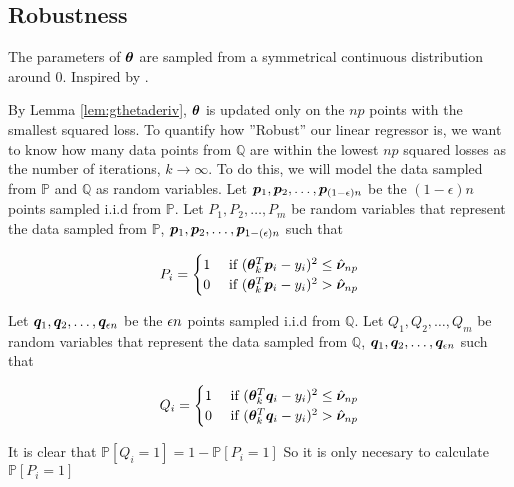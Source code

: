 \documentclass{article} %
\begin{document}
	\subsection{Robustness}
	\begin{assumption}\label{asm:sym-0}
		The parameters of ${\bm{\theta}}$ are sampled from a symmetrical continuous distribution around 0. Inspired by \cite{Lu_2020}. 
	\end{assumption}
	By Lemma \ref{lem:gthetaderiv}, ${\bm{\theta}}$ is updated only on the $np$ points with the smallest squared loss. To quantify how ''Robust'' our linear regressor is, we want to know how many data points from $\mathbb{Q}$ are within the lowest $np$ squared losses as the number of iterations, $k \to \infty$. To do this, we will model the data sampled from $\mathbb{P}$ and $\mathbb{Q}$ as random variables. Let ${\bm{p}}_1,{\bm{p}}_2,\ldots,{\bm{p}}_{(1-{\epsilon})n}$ be the $(1-\epsilon)n$ points sampled i.i.d from $\mathbb{P}$. Let $P_1,P_2,\dots,P_m$ be random variables that represent the data sampled from $\mathbb{P}$,  ${\bm{p}}_1,{\bm{p}}_2,\dots,{\bm{p}}_{1-({\epsilon})n}$ such that
	
	\begin{equation}
		P_i = \begin{cases}
					1 & \text{ if } ({\bm{\theta}}_k^T{\bm{p}}_i - y_{i})^2 \leq \hat{{\bm{\nu}}}_{np} \\
					0 & \text{ if } ({\bm{\theta}}_k^T{\bm{p}}_i - y_{i})^2 > \hat{{\bm{\nu}}}_{np} \\
				\end{cases}
	\end{equation}
	
	Let ${\bm{q}}_1,{\bm{q}}_2,\ldots,{\bm{q}}_{{\epsilon} n}$ be the ${\epsilon} n$ points sampled i.i.d from $\mathbb{Q}$. Let $Q_1,Q_2,\dots,Q_m$ be random variables that represent the data sampled from $\mathbb{Q}$,  ${\bm{q}}_1,{\bm{q}}_2,\dots,{\bm{q}}_{{\epsilon} n}$ such that
	
	\begin{equation}
		Q_i = \begin{cases}
			1 & \text{ if } ({\bm{\theta}}_k^T{\bm{q}}_i - y_{i})^2 \leq \hat{{\bm{\nu}}}_{np} \\
			0 & \text{ if } ({\bm{\theta}}_k^T{\bm{q}}_i - y_{i})^2 > \hat{{\bm{\nu}}}_{np} \\
		\end{cases}
	\end{equation}

	It is clear that $\displaystyle \mathbb{P}\left[Q_i = 1\right] = 1 - \mathbb{P}\left[P_i = 1\right]$ So it is only necesary to calculate $\mathbb{P}\left[P_i = 1\right]$
	
\end{document}
